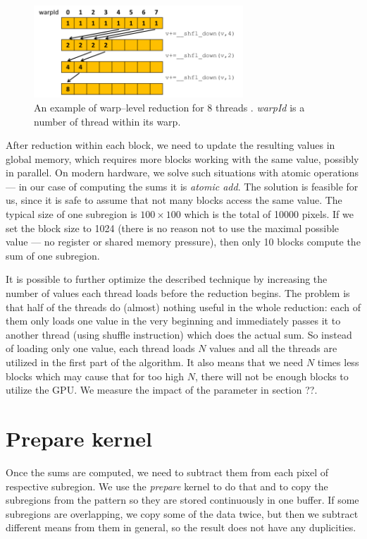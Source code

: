 \begin{figure}
	\centering
	\includegraphics[width=0.7\textwidth]{img/warp_reduce}
	\caption{An example of warp--level reduction for 8 threads \cite{parallelReduction}. \emph{warpId} is a number of thread within its warp.}
	\label{warp_reduce}
\end{figure}

After reduction within each block, we need to update the resulting values in global memory, which requires more blocks working with the same value, possibly in parallel. On modern hardware, we solve such situations with atomic operations --- in our case of computing the sums it is \emph{atomic add}. The solution is feasible for us, since it is safe to assume that not many blocks access the same value. The typical size of one subregion is $100 \times 100$ which is the total of 10000 pixels. If we set the block size to 1024 (there is no reason not to use the maximal possible value --- no register or shared memory pressure), then only 10 blocks compute the sum of one subregion.

It is possible to further optimize the described technique by increasing the number of values each thread loads before the reduction begins. The problem is that half of the threads do (almost) nothing useful in the whole reduction: each of them only loads one value in the very beginning and immediately passes it to another thread (using shuffle instruction) which does the actual sum. So instead of loading only one value, each thread loads $N$ values and all the threads are utilized in the first part of the algorithm. It also means that we need $N$ times less blocks which may cause that for too high $N$, there will not be enough blocks to utilize the GPU. We measure the impact of the parameter in section ??.

\section{Prepare kernel}
Once the sums are computed, we need to subtract them from each pixel of respective subregion. We use the \emph{prepare} kernel to do that and to copy the subregions from the pattern so they are stored continuously in one buffer. If some subregions are overlapping, we copy some of the data twice, but then we subtract different means from them in general, so the result does not have any duplicities.

